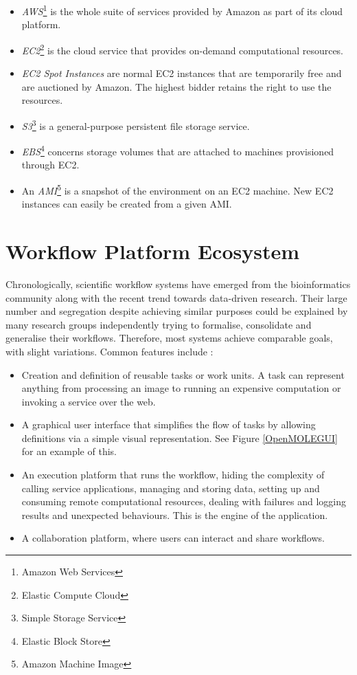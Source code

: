 \begin{itemize}
	\item \textit{AWS}\footnote{Amazon Web Services} \cite{AWS} is the whole suite of services provided by Amazon as part of its cloud platform.
	\item \textit{EC2}\footnote{Elastic Compute Cloud} \cite{EC2} is the cloud service that provides on-demand computational resources.
	\item \textit{EC2 Spot Instances} are normal EC2 instances that are temporarily free and are auctioned by Amazon. The highest bidder retains the right to use the resources.
	\item \textit{S3}\footnote{Simple Storage Service} \cite{S3} is a general-purpose persistent file storage service.
	\item \textit{EBS}\footnote{Elastic Block Store} \cite{EBS} concerns storage volumes that are attached to machines provisioned through EC2.
	\item An \textit{AMI}\footnote{Amazon Machine Image} is a snapshot of the environment on an EC2 machine. New EC2 instances can easily be created from a given AMI.
\end{itemize}

\section{Workflow Platform Ecosystem}

Chronologically, scientific workflow systems have emerged from the bioinformatics community along with the recent trend towards data-driven research. Their large number and segregation despite achieving similar purposes could be explained by many research groups independently trying to formalise, consolidate and generalise their workflows. Therefore, most systems achieve comparable goals, with slight variations. Common features include \cite{Goble2009}:

\begin{itemize}
	\item Creation and definition of reusable tasks or work units. A task can represent anything from processing an image to running an expensive computation or invoking a service over the web.
	\item A graphical user interface that simplifies the flow of tasks by allowing definitions via a simple visual representation. See Figure \ref{OpenMOLEGUI} for an example of this.
	\item An execution platform that runs the workflow, hiding the complexity of calling service applications, managing and storing data, setting up and consuming remote computational resources, dealing with failures and logging results and unexpected behaviours. This is the engine of the application.
	\item A collaboration platform, where users can interact and share workflows.
\end{itemize}

